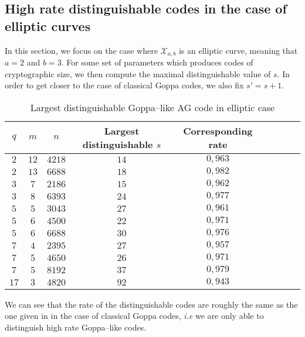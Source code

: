 \documentclass[a4paper]{article}
\theoremstyle{definition}
\theoremstyle{remark}
\newcommand{\calX}{\mathcal{X}}
\begin{document}
\subsection{High rate distinguishable codes in the case of elliptic curves}

In this section, we focus on the case where $\calX_{a,b}$ is an elliptic curve, meaning that $a=2$ and $b=3$. For some set of parameters which produces codes of cryptographic size, we then compute the maximal distinguishable value of $s$. In order to get closer to the case of classical Goppa codes, we also fix $s'=s+1$.
\begin{table}[h]
\begin{center}
\begin{tabular}{|c|c|c||c|c|c|c|c|c|}
    \hline
    $q$ & $m$ & $n$ & Largest distinguishable $s$ & Corresponding rate\\
    \hline \hline
     $2$ & $12$ & $4218$ & $14$ & $0,963$ \\
    \hline 
     $2$ & $13$ & $6688$ & $18$ & $0,982$  \\
    \hline \hline
     $3$ & $7$ & $2186$ & $15$ & $0,962$ \\
    \hline
     $3$ & $8$ & $6393$ & $24$ & $0,977$ \\
    \hline \hline
     $5$ & $5$ & $3043$ & $27$ & $0,961$  \\
    \hline
     $5$ & $6$ & $4500$ & $22$ & $0,971$ \\
    \hline
     $5$  & $6$ & $6688$ & $30$ & $0,976$ \\
    \hline \hline
     $7$ & $4$ & $2395$ & $27$ & $0,957$ \\
    \hline
      $7$ & $5$ & $4650$ & $26$ & $0,971$ \\
    \hline
      $7$ & $5$ & $8192$ & $37$ & $0,979$ \\
    \hline \hline
      $17$ & $3$ & $4820$ & $92$ & $0,943$ \\
    \hline
\end{tabular}
\caption{Largest distinguishable Goppa--like AG code in elliptic case}
\end{center}
\end{table}
We can see that the rate of the distinguishable codes are roughly the same as the one given in \cite{MT21} in the case of classical Goppa codes, \emph{i.e} we are only able to distinguish high rate Goppa--like codes.
\end{document}
